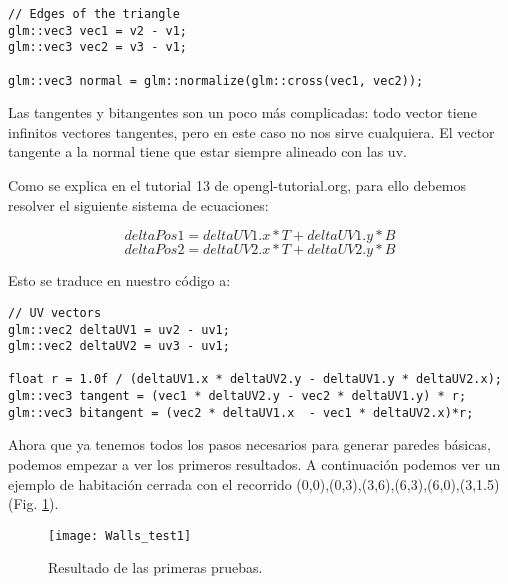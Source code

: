 \begin{lstlisting}
// Edges of the triangle
glm::vec3 vec1 = v2 - v1;
glm::vec3 vec2 = v3 - v1;

glm::vec3 normal = glm::normalize(glm::cross(vec1, vec2));
\end{lstlisting}

Las tangentes y bitangentes son un poco más complicadas: todo vector tiene infinitos vectores tangentes, pero en este caso no nos sirve cualquiera. El vector tangente a la normal tiene que estar siempre alineado con las uv.

Como se explica en el tutorial 13 de opengl-tutorial.org, para ello debemos resolver el siguiente sistema de ecuaciones:


\[ deltaPos1 = deltaUV1.x * T + deltaUV1.y * B \]
\[ deltaPos2 = deltaUV2.x * T + deltaUV2.y * B \]

Esto se traduce en nuestro código a:

\begin{lstlisting}
// UV vectors
glm::vec2 deltaUV1 = uv2 - uv1;
glm::vec2 deltaUV2 = uv3 - uv1;

float r = 1.0f / (deltaUV1.x * deltaUV2.y - deltaUV1.y * deltaUV2.x);
glm::vec3 tangent = (vec1 * deltaUV2.y - vec2 * deltaUV1.y) * r;
glm::vec3 bitangent = (vec2 * deltaUV1.x  - vec1 * deltaUV2.x)*r;
\end{lstlisting}

Ahora que ya tenemos todos los pasos necesarios para generar paredes básicas, podemos empezar a ver los primeros resultados. A continuación podemos ver un ejemplo de habitación cerrada con el recorrido (0,0),(0,3),(3,6),(6,3),(6,0),(3,1.5) (Fig. \ref{fig:walls_test_1}).

\begin{figure}[H]
    \centering
    \texttt{[image: Walls\_test1]}
    \caption{Resultado de las primeras pruebas.}
    \label{fig:walls_test_1}
\end{figure}
